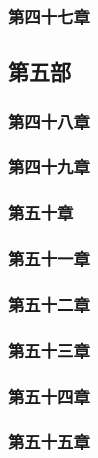\subsubsection{第四十七章}










\subsection{第五部}

\subsubsection{第四十八章}



\subsubsection{第四十九章}




\subsubsection{第五十章}



\subsubsection{第五十一章}



\subsubsection{第五十二章}



\subsubsection{第五十三章}



\subsubsection{第五十四章}



\subsubsection{第五十五章}



